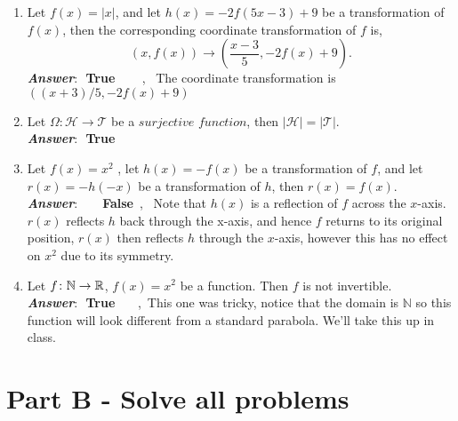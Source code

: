 \documentclass[12pt]{article} %
\begin{document}
\begin{qstn}
\begin{enumerate}
    \newpage

    \item Let $f(x) = \left|x\right|$, and let $h(x) = -2f(5x - 3) + 9$ be a transformation of $f(x)$, then the
      corresponding coordinate transformation of $f$ is,
       \[
           \left( x,f(x) \right)  \longrightarrow \left( \frac{x - 3}{5}, -2f(x) + 9 \right) 
      .\] 
       \textbf{\emph{Answer}}:\,\, \textbf{True} \,\,\,\,\,\, \, , \,
          The coordinate transformation is $\left( (x + 3) / 5, -2f(x) + 9 \right)$

    \item Let $\Omega \colon \mathcal{H} \to \mathcal{T}$ be a $\textit{surjective function}$, then $
      \left|\mathcal{H}\right| = \left|\mathcal{T}\right|$.\\
       \textbf{\emph{Answer}}:\,\, \textbf{True} \,\,\,\,\,\, \,

    \item Let $f(x) = x^2$ , let $h(x) = -f(x)$ be a transformation of $f$, and let $r(x) = -h(-x)$ be a
      transformation of $h$, then  $r(x) = f(x)$.\\
       \textbf{\emph{Answer}}:\,\,  \,\,\,\,\,\, \textbf{False}\, , \, Note that
       $h(x)$ is a reflection of $f$ across the $x$-axis. $r(x)$ reflects $h$ back through the x-axis, and hence
       $f$ returns to its original position, $r(x)$ then reflects $h$ through the $x$-axis, however this has no
       effect on $x^2$ due to its symmetry.

    \item Let $f \colon \mathbb N \to \mathbb R$, $f(x) = x^2$ be a function. Then $f$ is not invertible. \\
       \textbf{\emph{Answer}}:\,\, \textbf{True} \,\,\,\,\,\, \,,\, This one was
       tricky, notice that the domain is $\mathbb N$ so this function will look different from a 
       standard parabola. We'll take this up in class.



  \end{enumerate}
\end{qstn}

\newpage

\section*{Part B - Solve all problems}
\end{document}
